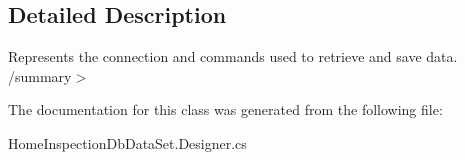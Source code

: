 \subsection{Detailed Description}
Represents the connection and commands used to retrieve and save data. /summary$>$ 

The documentation for this class was generated from the following file\+:\begin{DoxyCompactItemize}
\item 
Home\+Inspection\+Db\+Data\+Set.\+Designer.\+cs\end{DoxyCompactItemize}
